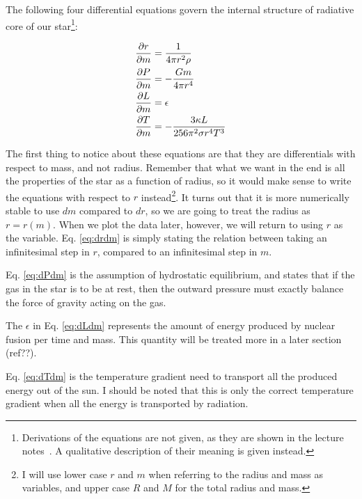 \documentclass[11pt]{article}
\begin{document}
The following four differential equations govern the internal
structure of radiative core of our star\footnote{Derivations of the
  equations are not given, as they are shown in the lecture
  notes~\cite{lecture-notes}. A qualitative description of their
  meaning is given instead.}:

\begin{align}
  \frac{\partial r}{\partial m} &= \frac{ 1 }{ 4\pi r^2\rho }\label{eq:drdm}\\
  \frac{\partial P}{\partial m} &= - \frac{ Gm }{ 4\pi r^4 }\label{eq:dPdm}\\
  \frac{\partial L}{\partial m} &= \epsilon\label{eq:dLdm}\\
  \frac{\partial T}{\partial m} &= - \frac{ 3\kappa L }{ 256 \pi^2 \sigma r^4T^3 }\label{eq:dTdm}
\end{align}

The first thing to notice about these equations are that they are
differentials with respect to mass, and not radius. Remember that what
we want in the end is all the properties of the star as a function of
radius, so it would make sense to write the equations with respect to
$r$ instead\footnote{I will use lower case $r$ and $m$ when referring
  to the radius and mass as variables, and upper case $R$ and $M$ for
  the total radius and mass.}. It turns out that it is more numerically
stable to use $dm$ compared to $dr$, so we are going to treat the
radius as $r=r(m)$. When we plot the data later, however, we will
return to using $r$ as the variable. Eq. \eqref{eq:drdm} is simply
stating the relation between taking an infinitesimal step in $r$,
compared to an infinitesimal step in $m$. 

Eq. \eqref{eq:dPdm} is the assumption of hydrostatic equilibrium, and
states that if the gas in the star is to be at rest, then the outward
pressure must exactly balance the force of gravity acting on the gas. 

The $\epsilon$ in Eq. \eqref{eq:dLdm} represents the amount of
energy produced by nuclear fusion per time and mass. This quantity
will be treated more in a later section (ref??).

Eq. \eqref{eq:dTdm} is the temperature gradient need to transport all
the produced energy out of the sun. I should be noted that this is
only the correct temperature gradient when all the energy is
transported by radiation. 




\printbibliography
\end{document}
